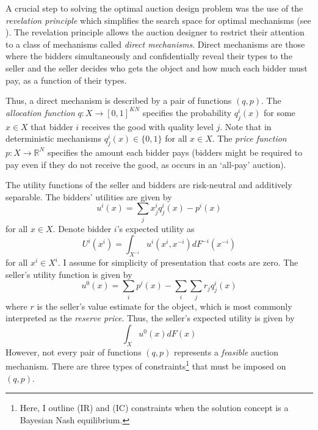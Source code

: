 A crucial step to solving the optimal auction design problem was the use of the \textit{revelation principle} which simplifies the search space for optimal mechanisms (see \cite[Lemma 1]{myerson1981optimal}). The revelation principle allows the auction designer to restrict their attention to a class of mechanisms called \textit{direct mechanisms}. Direct mechanisms are those where the bidders simultaneously and confidentially reveal their types to the seller and the seller decides who gets the object and how much each bidder must pay, as a function of their types.

Thus, a direct mechanism is described by a pair of functions $(q, p)$. The \textit{allocation function} $q:X\to[0,1]^{KN}$ specifies the probability $q_j^i(x)$ for some $x \in X$ that bidder $i$ receives the good with quality level $j$. Note that in deterministic mechanisms $q_j^i(x) \in \{0,1\}$ for all $x \in X$. The \textit{price function} $p:X\to\mathbb{R}^N$ specifies the amount each bidder pays (bidders might be required to pay even if they do not receive the good, as occurs in an `all-pay' auction).

The utility functions of the seller and bidders are risk-neutral and additively separable. The bidders' utilities are given by
\begin{equation}
    u^i(x) = \sum_j x_j^i q_j^i(x) - p^i(x)
\end{equation}
\noindent for all $x \in X$. Denote bidder $i$'s expected utility as
\begin{equation}\label{eq_expected_U}
    U^i(x^i) = \int_{X^{-i}} u^i(x^i,x^{-i}) dF^{-i}(x^{-i})
\end{equation}
\noindent for all $x^i \in X^i$. I assume for simplicity of presentation that costs are zero. The seller's utility function is given by
\begin{equation}
    u^0(x) = \sum_i p^i(x) - \sum_i \sum_j r_j q_j^i(x)  
\end{equation}
\noindent where $r$ is the seller's value estimate for the object, which is most commonly interpreted as the \textit{reserve price}. Thus, the seller's expected utility is given by
\begin{equation}
    \int_X u^0(x) dF(x)
\end{equation}
However, not every pair of functions $(q,p)$ represents a \textit{feasible} auction mechanism. There are three types of constraints\footnote{Here, I outline (IR) and (IC) constraints when the solution concept is a Bayesian Nash equilibrium.} that must be imposed on $(q,p)$. 

